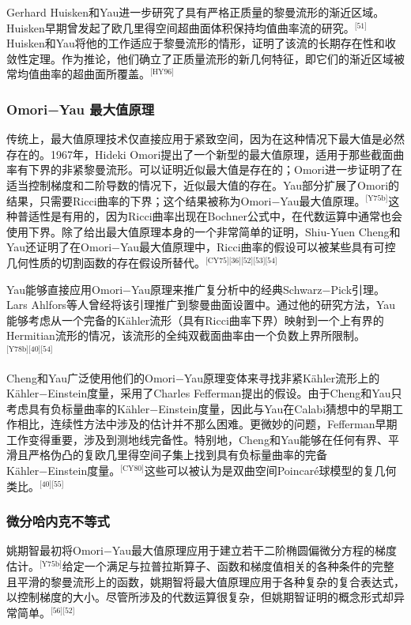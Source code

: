 Gerhard Huisken和Yau进一步研究了具有严格正质量的黎曼流形的渐近区域。Huisken早期曾发起了欧几里得空间超曲面体积保持均值曲率流的研究。\(^\text{[51]}\)Huisken和Yau将他的工作适应于黎曼流形的情形，证明了该流的长期存在性和收敛性定理。作为推论，他们确立了正质量流形的新几何特征，即它们的渐近区域被常均值曲率的超曲面所覆盖。\(^\text{[HY96]}\)
\subsubsection{Omori−Yau 最大值原理}  
传统上，最大值原理技术仅直接应用于紧致空间，因为在这种情况下最大值是必然存在的。1967年，Hideki Omori提出了一个新型的最大值原理，适用于那些截面曲率有下界的非紧黎曼流形。可以证明近似最大值是存在的；Omori进一步证明了在适当控制梯度和二阶导数的情况下，近似最大值的存在。Yau部分扩展了Omori的结果，只需要Ricci曲率的下界；这个结果被称为Omori−Yau最大值原理。\(^\text{[Y75b]}\)这种普适性是有用的，因为Ricci曲率出现在Bochner公式中，在代数运算中通常也会使用下界。除了给出最大值原理本身的一个非常简单的证明，Shiu-Yuen Cheng和Yau还证明了在Omori−Yau最大值原理中，Ricci曲率的假设可以被某些具有可控几何性质的切割函数的存在假设所替代。\(^\text{[CY75][36][52][53][54]}\)

Yau能够直接应用Omori−Yau原理来推广复分析中的经典Schwarz−Pick引理。Lars Ahlfors等人曾经将该引理推广到黎曼曲面设置中。通过他的研究方法，Yau能够考虑从一个完备的Kähler流形（具有Ricci曲率下界）映射到一个上有界的Hermitian流形的情况，该流形的全纯双截面曲率由一个负数上界所限制。\(^\text{[Y78b][40][54]}\)

Cheng和Yau广泛使用他们的Omori−Yau原理变体来寻找非紧Kähler流形上的Kähler−Einstein度量，采用了Charles Fefferman提出的假设。由于Cheng和Yau只考虑具有负标量曲率的Kähler−Einstein度量，因此与Yau在Calabi猜想中的早期工作相比，连续性方法中涉及的估计并不那么困难。更微妙的问题，Fefferman早期工作变得重要，涉及到测地线完备性。特别地，Cheng和Yau能够在任何有界、平滑且严格伪凸的复欧几里得空间子集上找到具有负标量曲率的完备Kähler−Einstein度量。\(^\text{[CY80]}\)这些可以被认为是双曲空间Poincaré球模型的复几何类比。\(^\text{[40][55]}\)
\subsubsection{微分哈内克不等式}
姚期智最初将Omori−Yau最大值原理应用于建立若干二阶椭圆偏微分方程的梯度估计。\(^\text{[Y75b]}\)给定一个满足与拉普拉斯算子、函数和梯度值相关的各种条件的完整且平滑的黎曼流形上的函数，姚期智将最大值原理应用于各种复杂的复合表达式，以控制梯度的大小。尽管所涉及的代数运算很复杂，但姚期智证明的概念形式却异常简单。\(^\text{[56][52]}\)

